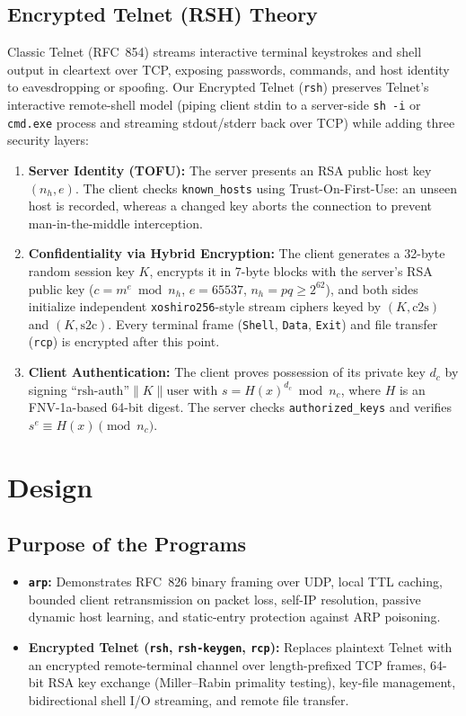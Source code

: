\documentclass[11pt,a4paper]{article}
\begin{document}
\subsection{Encrypted Telnet (RSH) Theory}
Classic Telnet (RFC~854) streams interactive terminal keystrokes and shell output in cleartext over TCP, exposing passwords, commands, and host identity to eavesdropping or spoofing. Our Encrypted Telnet (\texttt{rsh}) preserves Telnet's interactive remote-shell model (piping client stdin to a server-side \texttt{sh -i} or \texttt{cmd.exe} process and streaming stdout/stderr back over TCP) while adding three security layers:
\begin{enumerate}
  \item \textbf{Server Identity (TOFU):} The server presents an RSA public host key $(n_h, e)$. The client checks \texttt{known\_hosts} using Trust-On-First-Use: an unseen host is recorded, whereas a changed key aborts the connection to prevent man-in-the-middle interception.
  \item \textbf{Confidentiality via Hybrid Encryption:} The client generates a 32-byte random session key $K$, encrypts it in 7-byte blocks with the server's RSA public key ($c = m^e \bmod n_h$, $e=65537$, $n_h = pq \ge 2^{62}$), and both sides initialize independent \texttt{xoshiro256}-style stream ciphers keyed by $(K, \text{c2s})$ and $(K, \text{s2c})$. Every terminal frame (\texttt{Shell}, \texttt{Data}, \texttt{Exit}) and file transfer (\texttt{rcp}) is encrypted after this point.
  \item \textbf{Client Authentication:} The client proves possession of its private key $d_c$ by signing $\text{``rsh-auth''} \parallel K \parallel \text{user}$ with $s = H(x)^{d_c} \bmod n_c$, where $H$ is an FNV-1a-based 64-bit digest. The server checks \texttt{authorized\_keys} and verifies $s^e \equiv H(x) \pmod{n_c}$.
\end{enumerate}

\section{Design}

\subsection{Purpose of the Programs}
\begin{itemize}
  \item \textbf{\texttt{arp}:} Demonstrates RFC~826 binary framing over UDP, local TTL caching, bounded client retransmission on packet loss, self-IP resolution, passive dynamic host learning, and static-entry protection against ARP poisoning.
  \item \textbf{Encrypted Telnet (\texttt{rsh}, \texttt{rsh-keygen}, \texttt{rcp}):} Replaces plaintext Telnet with an encrypted remote-terminal channel over length-prefixed TCP frames, 64-bit RSA key exchange (Miller--Rabin primality testing), key-file management, bidirectional shell I/O streaming, and remote file transfer.
\end{itemize}
\end{document}
